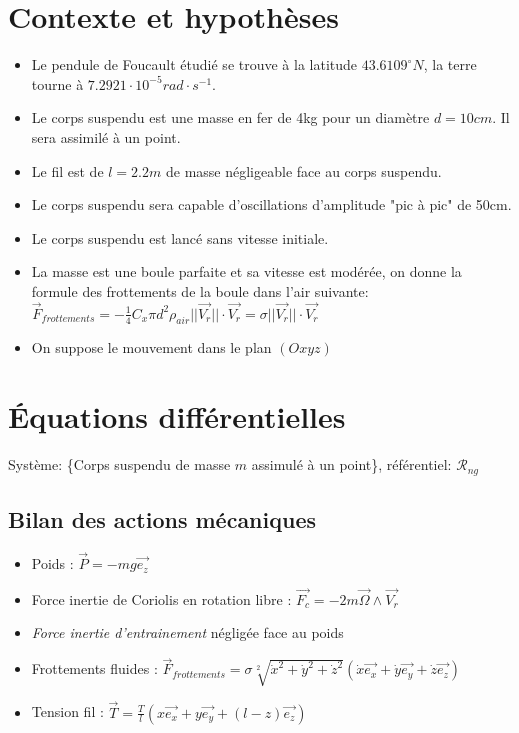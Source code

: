 \documentclass{article}
\begin{document}
	\section{Contexte et hypothèses}
	\begin{itemize}
		\itemsep 0em 
		\item Le pendule de Foucault étudié se trouve à la latitude $43.6109^{\circ}N$, la terre tourne à $7.2921\cdot 10^{-5}rad \cdot s^{-1}$.
		\item Le corps suspendu est une masse en fer de 4kg pour un diamètre $d=10cm$. Il sera assimilé à un point.
		\item Le fil est de $l = 2.2m$ de masse négligeable face au corps suspendu.
		\item Le corps suspendu sera capable d'oscillations d'amplitude "pic à pic" de 50cm.
		\item Le corps suspendu est lancé sans vitesse initiale.
		\item La masse est une boule parfaite et sa vitesse est modérée, on donne la formule des frottements de la boule dans l'air suivante: $\vec{F}_{frottements} = -\frac{1}{4} C_x \pi d^2 \rho_{air} ||\vec{V_r}||\cdot\vec{V_r} = \sigma ||\vec{V_r}||\cdot\vec{V_r} $
		\item On suppose le mouvement dans le plan $(Oxyz)$
	\end{itemize}
	
	
	\section{Équations différentielles}
	Système: \{Corps suspendu de masse $m$ assimulé à un point\}, référentiel: $\mathcal{R}_{ng}$
	\subsection{Bilan des actions mécaniques} 
	\begin{itemize}
		\itemsep 0em 
		\item Poids : $\vec{P} = -mg\vec{e_z}$
		\item Force inertie de Coriolis en rotation libre : $\vec{F_c} = -2m\vec{\Omega}\wedge\vec{V_r}$
		\item \textit{Force inertie d'entrainement} négligée face au poids
		\item Frottements fluides : $\vec{F}_{frottements} = \sigma\sqrt[2]{\dot{x}^2+\dot{y}^2+\dot{z}^2} (\dot{x}\vec{e_x}+\dot{y}\vec{e_y}+\dot{z}\vec{e_z})$
		\item Tension fil : $\vec{T} = \frac{T}{l}(x\vec{e_x}+y\vec{e_y}+(l-z)\vec{e_z}) $
	\end{itemize}
	
\end{document}
